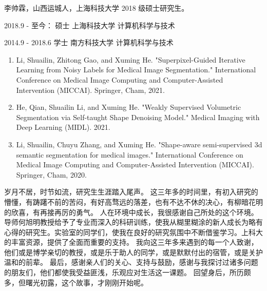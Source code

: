 \ifgraduate
\begin{resume}
李帅霖，山西运城人，上海科技大学 2018 级硕士研究生。
\end{resume}

\begin{education}
2018.9 - 至今：      \quad 硕士 \quad 上海科技大学 \quad 计算机科学与技术

2014.9 - 2018.6     \quad 学士 \quad 南方科技大学 \quad 计算机科学与技术
\end{education}

\begin{publications}
\begin{enumerate}
    \item Li, Shuailin, Zhitong Gao, and Xuming He. "Superpixel-Guided Iterative Learning from Noisy Labels for Medical Image Segmentation." International Conference on Medical Image Computing and Computer-Assisted Intervention (MICCAI). Springer, Cham, 2021.
    \item He, Qian, Shuailin Li, and Xuming He. "Weakly Supervised Volumetric Segmentation via Self-taught Shape Denoising Model." Medical Imaging with Deep Learning (MIDL). 2021.
    \item Li, Shuailin, Chuyu Zhang, and Xuming He. "Shape-aware semi-supervised 3d semantic segmentation for medical images." International Conference on Medical Image Computing and Computer-Assisted Intervention (MICCAI). Springer, Cham, 2020.
\end{enumerate}

\end{publications}

\begin{publications*}
\end{publications*}



\fi


\begin{acknowledgement}
岁月不居，时节如流，研究生生涯踏入尾声。
这三年多的时间里，有初入研究的懵懂，有踌躇不前的苦闷，有好高骛远的落差，也有不达不休的决心，有柳暗花明的欣喜，有再接再厉的勇气。
人在环境中成长，我很感谢自己所处的这个环境。导师何旭明教授给予了专业而深入的科研训练，使我从糊里糊涂的新人成长为略有心得的研究生。实验室的同学们，使我在良好的研究氛围中不断借鉴学习。上科大的丰富资源，提供了全面而重要的支持。
我向这三年多来遇到的每一个人致谢，他们或是博学亲切的教授，或是乐于助人的同学，或是默默付出的宿管，或是关护温和的前辈。
最后，感谢亲人们的关心、支持与鼓励，感谢与我探讨过诸多问题的朋友们，他们都使我受益匪浅，乐观应对生活这一课题。
回望身后，所历颇多，但曙光初露，这个故事，才刚刚开始呢。

\end{acknowledgement}